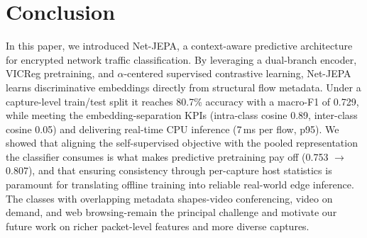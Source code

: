 \documentclass{article}
\begin{document}
\section{Conclusion}
In this paper, we introduced Net-JEPA, a context-aware predictive architecture for encrypted network traffic classification. By leveraging a dual-branch encoder, VICReg pretraining, and $\alpha$-centered supervised contrastive learning, Net-JEPA learns discriminative embeddings directly from structural flow metadata. Under a capture-level train/test split it reaches 80.7\% accuracy with a macro-F1 of 0.729, while meeting the embedding-separation KPIs (intra-class cosine 0.89, inter-class cosine 0.05) and delivering real-time CPU inference (7\,ms per flow, p95). We showed that aligning the self-supervised objective with the pooled representation the classifier consumes is what makes predictive pretraining pay off (0.753 $\rightarrow$ 0.807), and that ensuring consistency through per-capture host statistics is paramount for translating offline training into reliable real-world edge inference. The classes with overlapping metadata shapes-video conferencing, video on demand, and web browsing-remain the principal challenge and motivate our future work on richer packet-level features and more diverse captures.
\end{document}
